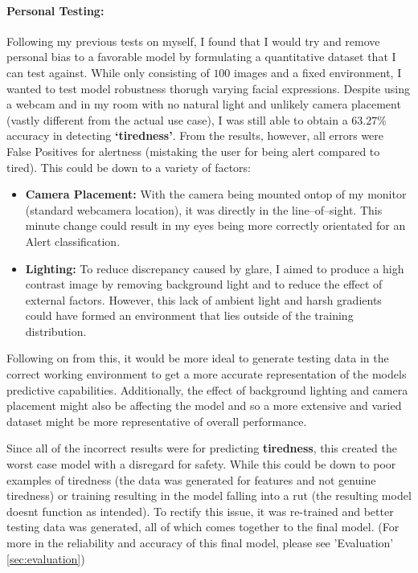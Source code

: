 \paragraph{Personal Testing:}
Following my previous tests on myself, I found that I would try and remove personal bias to a favorable model by formulating a
quantitative dataset that I can test against. While only consisting of $100$ images and a fixed environment, I wanted to test model
robustness thorugh varying facial expressions.
Despite using a webcam and in my room with no natural light and unlikely camera placement (vastly different from the actual use case),
I was still able to obtain a $63.27\%$ accuracy in detecting \textbf{‘tiredness’}. From the results, however, all errors were False Positives for
alertness (mistaking the user for being alert compared to tired). This could be down to a variety of factors:
\begin{itemize}
    \item \textbf{Camera Placement:} With the camera being mounted ontop of my monitor (standard webcamera location), it was directly
    in the line--of--sight. This minute change could result in my eyes being more correctly orientated for an Alert classification.
    \item \textbf{Lighting:} To reduce discrepancy caused by glare, I aimed to produce a high contrast image by removing background
    light and to reduce the effect of external factors. However, this lack of ambient light and harsh gradients could have formed an environment
    that lies outside of the training distribution.
\end{itemize}

Following on from this, it would be more ideal to generate testing data in the correct working environment to get a more accurate representation
of the models predictive capabilities. Additionally, the effect of background lighting and camera placement might also be affecting the model
and so a more extensive and varied dataset might be more representative of overall performance.

Since all of the incorrect results were for predicting \textbf{tiredness}, this created the worst case model with a disregard for safety.
While this could be down to poor examples of tiredness (the data was generated for features and not genuine tiredness) or training resulting
in the model falling into a rut (the resulting model doesnt function as intended). To rectify this issue, it was re-trained and better testing
data was generated, all of which comes together to the final model. (For more in the reliability and accuracy of this final model, please see
'Evaluation' \ref{sec:evaluation})
